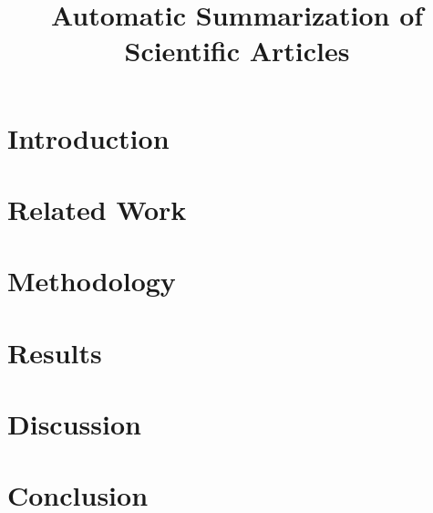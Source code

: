 \documentclass[12pt]{scrreprt}
\title{Automatic Summarization of Scientific Articles}
\date{}
\begin{document}
\maketitle

\tableofcontents

\begin{abstract}

\end{abstract}

\chapter{Introduction}
\label{section:introduction}


\chapter{Related Work}
\label{section:related work}


\chapter{Methodology}
\label{section: method}


\chapter{Results}
\label{section:experiments}


\chapter{Discussion}
\label{section:discussion}


\chapter{Conclusion}
\label{section:conclusion}




\end{document}
